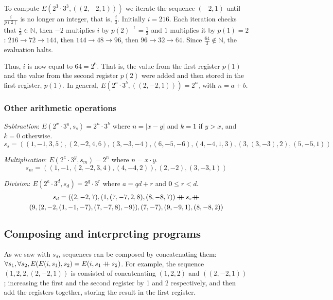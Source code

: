 \documentclass{article}
\newcommand\doubleplus{\mathbin{{+}\mspace{-8mu}{+}}}
\begin{document}
To compute $E(2^3 \cdot 3^3, ((2, -2, 1)))$ we iterate the sequence $(-2, 1)$ until $\frac{i}{p(2)}$ is no longer an integer, that is, $\frac{i}{3}$. Initially $i = 216$. Each iteration checks that $\frac{i}{3} \in \mathbb{N}$, then $-2$ multiplies $i$ by $p(2)^{-1} = \frac{1}{3}$ and $1$ multiplies it by $p(1) = 2$: $216 \to 72 \to 144$, then $144 \to 48 \to 96$, then $96 \to 32 \to 64$. Since $\frac{64}{3} \notin \mathbb{N}$, the evaluation halts.

Thus, $i$ is now equal to $64 = 2^6$. That is, the value from the first register $p(1)$ and the value from the second register $p(2)$ were added and then stored in the first register, $p(1)$. In general, $E(2^a \cdot 3^b, ((2, -2, 1))) = 2^n$, with $n = a + b$.

\subsubsection{Other arithmetic operations}

\textit{Subtraction}: $E(2^x \cdot 3^y, s_s) = 2^n \cdot 3^k$ where $n = |x - y|$ and $k = 1$ if $y > x$, and $k = 0$ otherwise.
$$s_s = ((1, -1, 3, 5), (2, -2, 4, 6), (3, -3, -4), (6, -5, -6), (4, -4, 1, 3), (3, (3, -3), 2), (5, -5, 1))$$

\textit{Multiplication}: $E(2^x \cdot 3^y, s_m) = 2^n$ where $n = x \cdot y$.
$$s_m = ((1, -1, (2, -2, 3, 4), (4, -4, 2)), (2, -2), (3, -3, 1))$$

\textit{Division}: $E(2^a \cdot 3^d, s_d) = 2^q \cdot 3^r$ where $a = qd + r$ and $0 \leq r < d$.
\begin{gather*}
s_d = ((2, -2, 7), (1, (7, -7, 2, 8), (8, -8, 7)) \doubleplus s_s \doubleplus \\ (9, (2, -2, (1, -1, -7), (7, -7, 8), -9)), (7, -7), (9, -9, 1), (8, -8, 2))
\end{gather*}

\subsection{Composing and interpreting programs}

As we saw with $s_d$, sequences can be composed by concatenating them: $\forall s_1, \forall s_2, E(E(i, s_1), s_2) = E(i, s_1 \doubleplus s_2)$. For example, the sequence $(1, 2, 2, (2, -2, 1))$ is consisted of concatenating $(1, 2, 2)$ and $((2, -2, 1))$; increasing the first and the second register by 1 and 2 respectively, and then add the registers together, storing the result in the first register.
\end{document}
